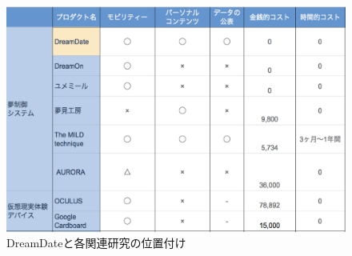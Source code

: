 \begin{figure}[htbp]
\begin{center}
\includegraphics[width=15cm]{eps/positioning.eps}
\caption{DreamDateと各関連研究の位置付け}
\label{positioning}
\end{center}
\end{figure}